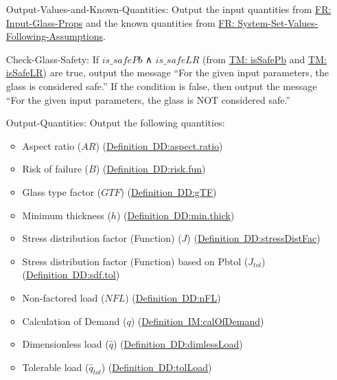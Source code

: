 \documentclass[12pt]{article}
\begin{document}
\begin{itemize}
\item[Output-Values-and-Known-Quantities:\phantomsection\label{outputValsAndKnownQuants}]Output the input quantities from \hyperref[inputGlassProps]{FR: Input-Glass-Props} and the known quantities from \hyperref[sysSetValsFollowingAssumps]{FR: System-Set-Values-Following-Assumptions}.
\item[Check-Glass-Safety:\phantomsection\label{checkGlassSafety}]If $is\_safePb$ ∧ $is\_safeLR$ (from \hyperref[T:isSafePb]{TM: isSafePb} and \hyperref[T:isSafeLR]{TM: isSafeLR}) are true, output the message ``For the given input parameters, the glass is considered safe.'' If the condition is false, then output the message ``For the given input parameters, the glass is NOT considered safe.''
\item[Output-Quantities:\phantomsection\label{outputQuants}]Output the following quantities:
                                                            \begin{itemize}
                                                            \item{Aspect ratio ($AR$) (\hyperref[DD:aspect.ratio]{Definition~DD:aspect.ratio})}
                                                            \item{Risk of failure ($B$) (\hyperref[DD:risk.fun]{Definition~DD:risk.fun})}
                                                            \item{Glass type factor ($GTF$) (\hyperref[DD:gTF]{Definition~DD:gTF})}
                                                            \item{Minimum thickness ($h$) (\hyperref[DD:min.thick]{Definition~DD:min.thick})}
                                                            \item{Stress distribution factor (Function) ($J$) (\hyperref[DD:stressDistFac]{Definition~DD:stressDistFac})}
                                                            \item{Stress distribution factor (Function) based on Pbtol (${J_{tol}}$) (\hyperref[DD:sdf.tol]{Definition~DD:sdf.tol})}
                                                            \item{Non-factored load ($NFL$) (\hyperref[DD:nFL]{Definition~DD:nFL})}
                                                            \item{Calculation of Demand ($q$) (\hyperref[IM:calOfDemand]{Definition~IM:calOfDemand})}
                                                            \item{Dimensionless load ($\hat{q}$) (\hyperref[DD:dimlessLoad]{Definition~DD:dimlessLoad})}
                                                            \item{Tolerable load (${\hat{q}_{tol}}$) (\hyperref[DD:tolLoad]{Definition~DD:tolLoad})}
                                                            \end{itemize}
\end{itemize}
\end{document}
